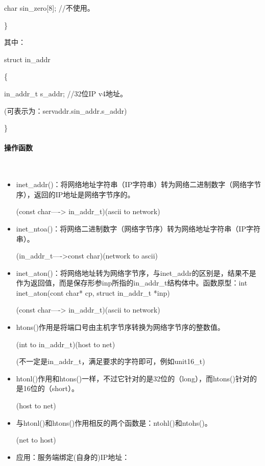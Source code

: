 \documentclass[UTF8]{article}%
\begin{document}
\qquad char \quad sin\_zero[8]; //不使用。

\}

其中：

struct in\_addr 

\{

\qquad in\_addr\_t s\_addr; //32位IP v4地址。

\qquad (可表示为：servaddr.sin\_addr.s\_addr)

\}

\paragraph{操作函数}~{}

\begin{itemize}
    \item inet\_addr()：将网络地址字符串（IP字符串）转为网络二进制数字（网络字节序），返回的IP地址是网络字节序的。
    
    (const char----> in\_addr\_t)(ascii to network)

    \item inet\_ntoa()：将网络二进制数字（网络字节序）转为网络地址字符串（IP字符串）。
    
    (in\_addr\_t---->const char)(network to ascii)


    \item inet\_aton()：将网络地址转为网络字节序，与inet\_addr的区别是，结果不是作为返回值，而是保存形参inp所指的in\_addr\_t结构体中。函数原型：int inet\_aton(cont char* cp, struct in\_addr\_t *inp)
    
    (const char----> in\_addr\_t)(ascii to network)

    \item htons()作用是将端口号由主机字节序转换为网络字节序的整数值。
    
    (int to in\_addr\_t)(host to net)
    
    (不一定是in\_addr\_t，满足要求的字符即可，例如unit16\_t)

    \item htonl()作用和htons()一样，不过它针对的是32位的（long），而htons()针对的是16位的（short）。
    
    (host to net)

    \item 与htonl()和htons()作用相反的两个函数是：ntohl()和ntohs()。
    
    (net to host)
    
    \item 应用：服务端绑定(自身的)IP地址：


\end{itemize}
\end{document}
